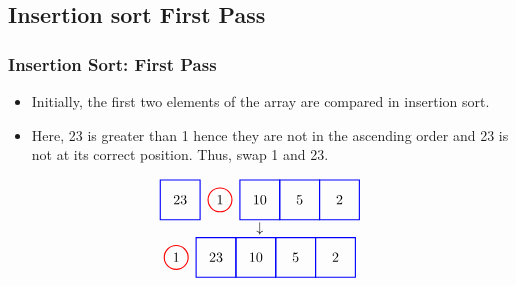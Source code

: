 \documentclass{beamer}
\begin{document}
\subsection{Insertion sort First Pass}
\begin{frame}[c, fragile]
\frametitle{Insertion Sort: First Pass}

\begin{itemize}
    \item Initially, the first two elements of the array are compared in insertion sort.
    \item Here, 23 is greater than 1 hence they are not in the ascending order and 23 is not at its correct position. Thus, swap 1 and 23.
\end{itemize}

\[
\begin{array}{c}
\begin{tikzpicture}[baseline=(current bounding box.center)]
    \node at (0,0) {23};
    \node at (1,0) {1};
    \node at (2,0) {10};
    \node at (3,0) {5};
    \node at (4,0) {2};
    \draw[red, thick] (1,0) circle (0.3);
    \draw[blue, thick] (-0.5,-0.5) rectangle (0.5,0.5);
    \draw[blue, thick] (1.5,-0.5) rectangle (2.5,0.5);
    \draw[blue, thick] (2.5,-0.5) rectangle (3.5,0.5);
    \draw[blue, thick] (3.5,-0.5) rectangle (4.5,0.5);
\end{tikzpicture} \\
\downarrow \\
\begin{tikzpicture}[baseline=(current bounding box.center)]
    \node at (0,0) {1};
    \node at (1,0) {23};
    \node at (2,0) {10};
    \node at (3,0) {5};
    \node at (4,0) {2};
    \draw[red, thick] (0,0) circle (0.3);
    \draw[blue, thick] (0.5,-0.5) rectangle (1.5,0.5);
    \draw[blue, thick] (1.5,-0.5) rectangle (2.5,0.5);
    \draw[blue, thick] (2.5,-0.5) rectangle (3.5,0.5);
    \draw[blue, thick] (3.5,-0.5) rectangle (4.5,0.5);
\end{tikzpicture}
\end{array}
\]
\end{frame}
\end{document}

